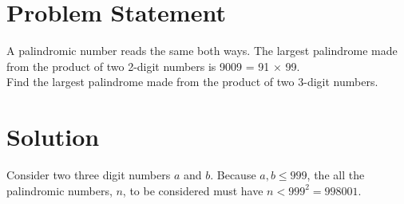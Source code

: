 \documentclass{article}
\begin{document}
\section*{Problem Statement}
A palindromic number reads the same both ways. The largest palindrome made from the product of two 2-digit numbers is 9009 = 91 × 99.\\[12pt]

\noindent Find the largest palindrome made from the product of two 3-digit numbers.
\section*{Solution}
Consider two three digit numbers $a$ and $b$. Because $a, b \le 999$, the all the palindromic numbers, $n$, to be considered must have $n < 999^{2} = 998001$.
\end{document}
